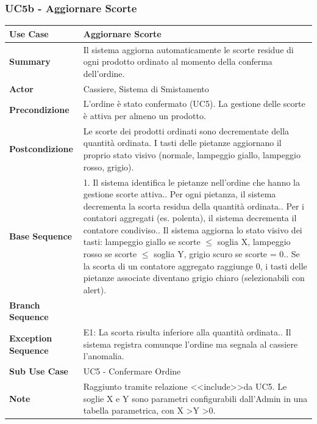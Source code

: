 \newpage 

\subsubsection*{UC5b - Aggiornare Scorte}
\begin{center}
\begin{tabular}{|p{}|p{}|}
\hline
\textbf{Use Case} & Aggiornare Scorte \\ \hline
\textbf{Summary} & Il sistema aggiorna automaticamente le scorte residue di ogni prodotto ordinato al momento della conferma dell'ordine. \\ \hline
\textbf{Actor} & Cassiere, Sistema di Smistamento \\ \hline
\textbf{Precondizione} & L'ordine è stato confermato (UC5). La gestione delle scorte è attiva per almeno un prodotto. \\ \hline
\textbf{Postcondizione} & Le scorte dei prodotti ordinati sono decrementate della quantità ordinata. I tasti delle pietanze aggiornano il proprio stato visivo (normale, lampeggio giallo, lampeggio rosso, grigio). \\ \hline
\textbf{Base Sequence} & 1. Il sistema identifica le pietanze nell'ordine che hanno la gestione scorte attiva.\newline 2. Per ogni pietanza, il sistema decrementa la scorta residua della quantità ordinata.\newline 3. Per i contatori aggregati (es. polenta), il sistema decrementa il contatore condiviso.\newline 4. Il sistema aggiorna lo stato visivo dei tasti: lampeggio giallo se scorte $\le$ soglia X, lampeggio rosso se scorte $\le$ soglia Y, grigio scuro se scorte = 0.\newline 5. Se la scorta di un contatore aggregato raggiunge 0, i tasti delle pietanze associate diventano grigio chiaro (selezionabili con alert). \\ \hline
\textbf{Branch Sequence} & \\ \hline
\textbf{Exception Sequence} & E1: La scorta risulta inferiore alla quantità ordinata.\newline 2. Il sistema registra comunque l'ordine ma segnala al cassiere l'anomalia. \\ \hline
\textbf{Sub Use Case} & UC5 - Confermare Ordine \\ \hline
\textbf{Note} & Raggiunto tramite relazione \textless\textless include\textgreater\textgreater da UC5. Le soglie X e Y sono parametri configurabili dall'Admin in una tabella parametrica, con X \textgreater Y \textgreater 0. \\ \hline
\end{tabular}
\end{center}

